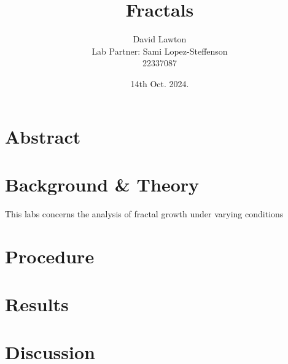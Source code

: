 \documentclass{article}
\title{Fractals}
\author{David Lawton\\
        Lab Partner: Sami Lopez-Steffenson\\
        22337087}
\date{14th Oct. 2024.}
\theoremstyle{definition}
\theoremstyle{remark}
\begin{document}
\maketitle

\tableofcontents

\section{Abstract}

\section{Background \& Theory}
This labs concerns the analysis of fractal growth under varying conditions


\section{Procedure}

\section{Results}

\section{Discussion}
\end{document}
